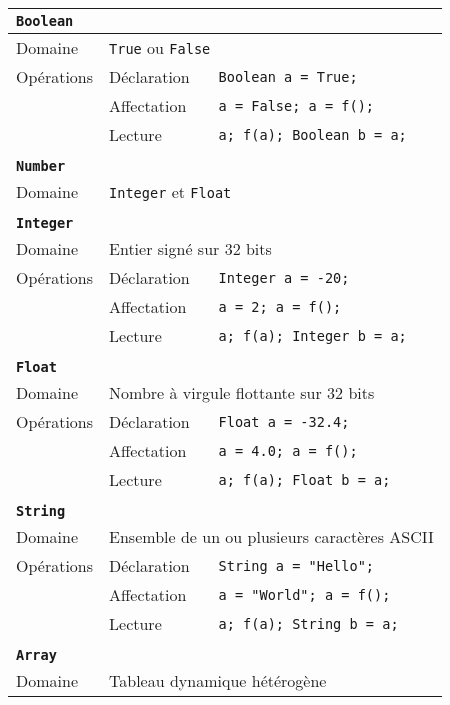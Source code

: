 \documentclass[french]{article}
\begin{document}
				\begin{longtable}{lll}
					\textbf{\texttt{Boolean}}\\ \hline \hline
					Domaine & \multicolumn{2}{l}{\texttt{True} ou \texttt{False}}\\ 
					Opérations & Déclaration & \texttt{Boolean a = True;}\\
							   & Affectation & \texttt{a = False; a = f();}\\
							   & Lecture & \texttt{a; f(a); Boolean b = a;}\\ 
					\\
					\textbf{\texttt{Number}}\\ \hline \hline
					Domaine & \multicolumn{2}{l}{\texttt{Integer} et \texttt{Float}}\\ 
					\\
					\textbf{\texttt{Integer}}\\ \hline \hline
					Domaine & \multicolumn{2}{l}{Entier signé sur 32 bits}\\
					Opérations & Déclaration & \texttt{Integer a = -20;}\\
							   & Affectation & \texttt{a = 2; a = f();}\\
							   & Lecture & \texttt{a; f(a); Integer b = a;}\\ 
					\\
					\textbf{\texttt{Float}}\\ \hline \hline
					Domaine & \multicolumn{2}{l}{Nombre à virgule flottante sur 32 bits}\\
					Opérations & Déclaration & \texttt{Float a = -32.4;}\\
							   & Affectation & \texttt{a = 4.0; a = f();}\\
							   & Lecture & \texttt{a; f(a); Float b = a;}\\ 
					\\
					\textbf{\texttt{String}}\\ \hline \hline
					Domaine & \multicolumn{2}{l}{Ensemble de un ou plusieurs caractères ASCII}\\
					Opérations & Déclaration & \texttt{String a = "Hello";}\\
							   & Affectation & \texttt{a = "World"; a = f();}\\
							   & Lecture & \texttt{a; f(a); String b = a;}\\ 
					\\
					\textbf{\texttt{Array}}\\ \hline \hline
					Domaine & \multicolumn{2}{l}{Tableau dynamique hétérogène}\\

\end{longtable}
\end{document}
